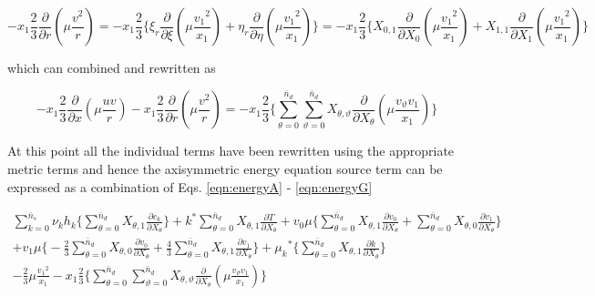 \begin{displaymath}
	- x_1\frac{2}{3}\frac{\partial}{\partial r}(\mu \frac{v^2}{r}) = -x_1\frac{2}{3}\Big\{\xi_r
	\frac{\partial}{\partial \xi}(\mu\frac{{v_1}^2}{x_1}) + \eta_r\frac{\partial}{\partial \eta}(\mu\frac{{v_1}^2}{x_1})\Big\}
	= -x_1\frac{2}{3}\Big\{X_{0,1}
	\frac{\partial}{\partial X_0}(\mu\frac{{v_1}^2}{x_1}) + X_{1,1}\frac{\partial}{\partial X_1}(\mu\frac{{v_1}^2}{x_1})\Big\}
\end{displaymath}

	which can combined and rewritten as

\begin{equation}
	- x_1\frac{2}{3}\frac{\partial}{\partial x}(\mu \frac{uv}{r}) - x_1\frac{2}{3}\frac{\partial}{\partial r}
	(\mu \frac{v^2}{r}) = -x_1\frac{2}{3}\Big\{\sum_{\theta = 0}^{\bar{n}_d} \sum_{\vartheta = 0}^{\bar{n}_d}
	X_{\theta,\vartheta}\frac{\partial}{\partial X_\theta}(\mu\frac{v_\vartheta v_1}{x_1}) \Big\}
\label{eqn:energyG}
\end{equation}

	At this point all the individual terms have been rewritten using the appropriate metric terms and hence the
axisymmetric energy equation source term can be expressed as a combination of Eqs. \ref{eqn:energyA} - \ref{eqn:energyG}

\begin{equation}
  \begin{array}{c}
	\sum_{k = 0}^{\bar{n}_s}\nu_k h_k \Big\{\sum_{\theta = 0}^{\bar{n}_d} X_{\theta,1}
	\frac{\partial c_k}{\partial X_\theta}\Big\} + k^*\sum_{\theta = 0}^{\bar{n}_d} X_{\theta,1} 
	\frac{\partial T}{\partial X_\theta} + v_0\mu\Big\{\sum_{\theta = 0}^{\bar{n}_d} X_{\theta,1}
	\frac{\partial v_0}{\partial X_\theta} + \sum_{\theta = 0}^{\bar{n}_d} X_{\theta,0}
	\frac{\partial v_1}{\partial X_\theta}\Big\} \\
	+ v_1\mu\Big\{-\frac{2}{3}\sum_{\theta = 0}^{\bar{n}_d}X_{\theta,0}
	\frac{\partial v_0}{\partial X_\theta} + \frac{4}{3}\sum_{\theta = 0}^{\bar{n}_d}X_{\theta,1}
	\frac{\partial v_1}{\partial X_\theta} \Big\} 
	+ {\mu_k}^* \Big\{\sum_{\theta = 0}^{\bar{n}_d}X_{\theta,1}
	\frac{\partial k}{\partial X_\theta}\Big\} \\
	- \frac{2}{3}\mu\frac{{v_1}^2}{x_1}
	 -x_1\frac{2}{3}\Big\{\sum_{\theta = 0}^{\bar{n}_d} \sum_{\vartheta = 0}^{\bar{n}_d}
	X_{\theta,\vartheta}\frac{\partial}{\partial X_\theta}(\mu\frac{v_\vartheta v_1}{x_1}) \Big\}
  \end{array}
\label{eqn:energycomp}
\end{equation}

